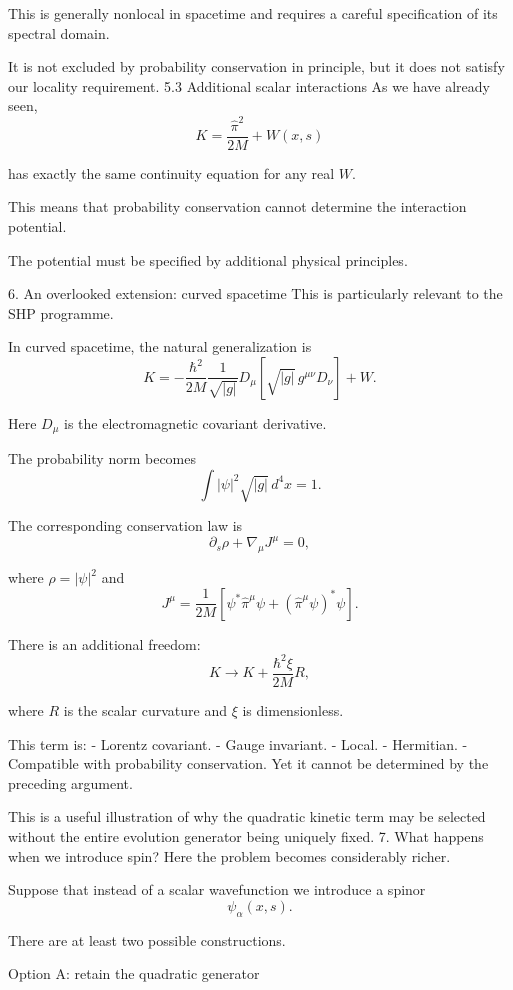 This is generally nonlocal in spacetime and requires a careful specification of its spectral domain.

It is not excluded by probability conservation in principle, but it does not satisfy our locality requirement.
5.3 Additional scalar interactions
As we have already seen,
\[
K=\frac{\hat\pi^2}{2M}+W(x,s)
\]

has exactly the same continuity equation for any real \(W\).

This means that probability conservation cannot determine the interaction potential.

The potential must be specified by additional physical principles.

6. An overlooked extension: curved spacetime
This is particularly relevant to the SHP programme.

In curved spacetime, the natural generalization is
\[
\boxed{
K=
-\frac{\hbar^2}{2M}
\frac{1}{\sqrt{|g|}}
D_\mu
\left[
\sqrt{|g|}\,g^{\mu\nu}D_\nu
\right]
+W.
}
\tag{16}
\]

Here \(D_\mu\) is the electromagnetic covariant derivative.

The probability norm becomes
\[
\int |\psi|^2\sqrt{|g|}\,d^4x=1.
\tag{17}
\]

The corresponding conservation law is
\[
\partial_s\rho+
\nabla_\mu J^\mu=0,
\tag{18}
\]

where \(\rho=|\psi|^2\) and
\[
J^\mu=
\frac{1}{2M}
\left[
\psi^*\hat\pi^\mu\psi+
(\hat\pi^\mu\psi)^*\psi
\right].
\]

There is an additional freedom:
\[
K\longrightarrow K+\frac{\hbar^2\xi}{2M}R,
\tag{19}
\]

where \(R\) is the scalar curvature and \(\xi\) is dimensionless.

This term is:
- Lorentz covariant.
- Gauge invariant.
- Local.
- Hermitian.
- Compatible with probability conservation.
Yet it cannot be determined by the preceding argument.

This is a useful illustration of why the quadratic kinetic term may be selected without the entire evolution generator being uniquely fixed.
7. What happens when we introduce spin?
Here the problem becomes considerably richer.

Suppose that instead of a scalar wavefunction we introduce a spinor
\[
\psi_\alpha(x,s).
\]

There are at least two possible constructions.

Option A: retain the quadratic generator

